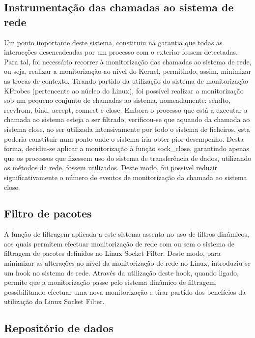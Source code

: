 \documentclass[a4paper]{llncs}
\begin{document}
\subsection*{Instrumentação das chamadas ao sistema de rede}
\label{sub:mon_syscalls}

Um ponto importante deste sistema, constituiu na garantia que todas as interacções desencadeadas por um processo com o exterior fossem detectadas. Para tal, foi necessário recorrer à monitorização das chamadas ao sistema de rede, ou seja, realizar a monitorização ao nível do Kernel, permitindo, assim, minimizar as trocas de contexto. Tirando partido da utilização do sistema de monitorização KProbes (pertencente ao núcleo do Linux), foi possível realizar a monitorização sob um pequeno conjunto de chamadas ao sistema, nomeadamente: sendto, recvfrom, bind, accept, connect e close. Embora o processo que está a executar a chamada ao sistema esteja a ser filtrado, verificou-se que aquando da chamada ao sistema close, ao ser utilizada intensivamente por todo o sistema de ficheiros, esta poderia constituir num ponto onde o sistema iria obter pior desempenho. Desta forma, decidiu-se aplicar a monitorização à função sock\_close, garantindo apenas que os processos que fizessem uso do sistema de transferência de dados, utilizando os métodos da rede, fossem utilizados. Deste modo, foi possível reduzir significativamente o número de eventos de monitorização da chamada ao sistema close.

\subsection*{Filtro de pacotes}
\label{sub:packet_filter}

A função de filtragem aplicada a este sistema assenta no uso de filtros dinâmicos, aos quais permitem efectuar monitorização de rede com ou sem o sistema de filtragem de pacotes definidos no Linux Socket Filter. Deste modo, para minimizar as alterações ao nível da monitorização de rede no Linux, introduziu-se um hook no sistema de rede. Através da utilização deste hook, quando ligado, permite que a monitorização passe pelo sistema dinâmico de filtragem, possibilitando efectuar uma nova monitorização e tirar partido dos benefícios da utilização do Linux Socket Filter.

\subsection*{Repositório de dados}
\label{sub:data_repository}
\end{document}
